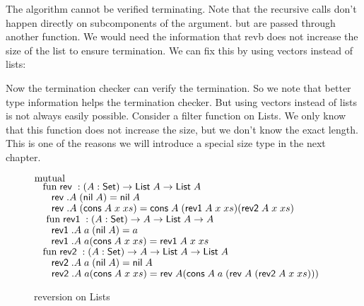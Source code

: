 The algorithm cannot be verified terminating.
Note that the recursive calls don't happen directly on subcomponents of the argument.
but are passed through another function.
We would need the information that revb does not increase the size of the list to ensure termination.
We can fix this by using vectors instead of lists:

Now the termination checker can verify the termination.
So we note that better type information helps the termination checker.
But using vectors instead of lists is not always easily possible.
Consider a filter function on Lists. We only know that this function does not increase the size, but
we don't know the exact length.
This is one of the reasons we will introduce a special size type in the next chapter.

\begin{figure}
$\mathrm{mutual}\; $  \\
$ \hspace*{3mm} \mathrm{fun}\; \mathsf{rev}\; : ( A : \mathsf{Set} ) \rightarrow{\mathsf{List}\;A \rightarrow\mathsf{List}\;A} $ \\
$ \spc \spc \rev .A \; (\nil A ) = \nil A$\\
$ \spc \spc \rev .A \; (\cons A \;x  \; xs) = \cons A \; (\reva A \; x \; xs) (\revb A \; x \; xs)$\\
$\ \hspace*{3mm} \mathrm{fun}\; \mathsf{rev1}\; : ( A  : \mathsf{Set} ) \rightarrow{A  \rightarrow\mathsf{List}\;A \rightarrow A}$\\
$ \spc \spc \reva .A \; a \; (\nil A ) = a$ \\
$\spc \spc \reva .A \; a (\cons A \; x \; xs) = \reva A \; x \; xs$\\
$\hspace*{3mm} \mathrm{fun}\; \mathsf{rev2}\; : ( A : \mathsf{Set} ) \rightarrow{ A \rightarrow\mathsf{List}\;A \rightarrow\mathsf{List}\;A} $\\
$\spc \spc \revb .A \; a \; (\nil A ) = \nil A $\\
$\spc \spc \revb .A \; a (\cons A\;  x \; xs) = \rev A (\cons A \; a \; (\rev A \; (\revb A \; x \; xs)))$

\caption{reversion on Lists}  
\end{figure}

